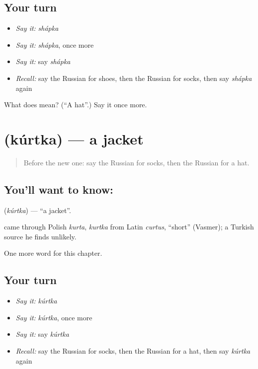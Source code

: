 \subsection*{Your turn}
\begin{itemize}
\raggedright
  \item \emph{Say it:} \emph{shápka}
  \item \emph{Say it:} \emph{shápka}, once more
  \item \emph{Say it:} say \emph{shápka}
  \item \emph{Recall:} say the Russian for shoes, then the Russian for socks, then say \emph{shápka} again
\end{itemize}

\begin{tcolorbox}[breakable,colback=teal!4,colframe=teal!35!black,title={Before you move on}]
What does  mean? (\textquotedblleft{}A hat\textquotedblright{}.) Say it once more.
\end{tcolorbox}
\section[\texorpdfstring{\ru{куртка} (kúrtka)}{куртка (kúrtka)}]{ (kúrtka) — a jacket}

\label{lesson:RU-C103-jacket}



\begin{quote}
Before the new one: say the Russian for socks, then the Russian for a hat.
\end{quote}

\subsection*{You'll want to know: }
\textbf{} (\emph{kúrtka}) — \textquotedblleft{}a jacket\textquotedblright{}.

\begin{cousinweb}
\textbf{} came through Polish \emph{kurta}, \emph{kurtka} from Latin \emph{curtus}, \textquotedblleft{}short\textquotedblright{} (Vasmer); a Turkish source he finds unlikely.
\end{cousinweb}

\begin{grammarlens}[title={What you've built}]
One more word for this chapter.
\end{grammarlens}

\subsection*{Your turn}
\begin{itemize}
\raggedright
  \item \emph{Say it:} \emph{kúrtka}
  \item \emph{Say it:} \emph{kúrtka}, once more
  \item \emph{Say it:} say \emph{kúrtka}
  \item \emph{Recall:} say the Russian for socks, then the Russian for a hat, then say \emph{kúrtka} again
\end{itemize}

